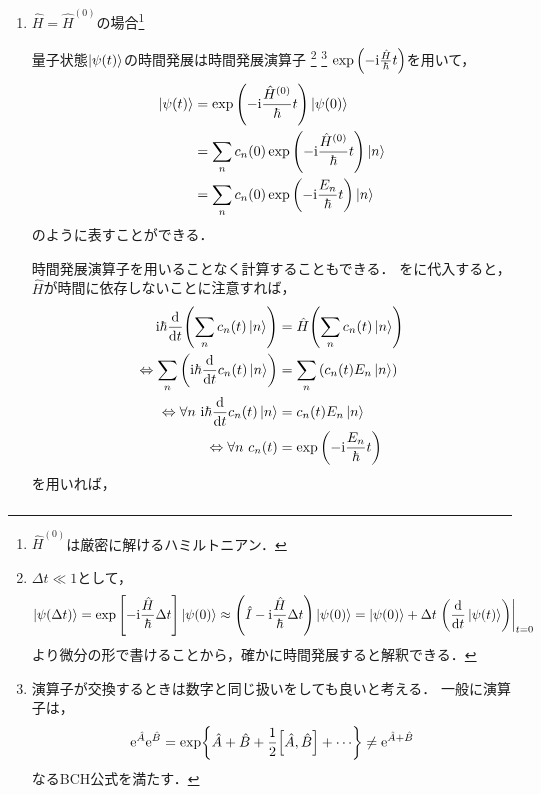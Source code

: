 \documentclass{report}
\begin{document}
  \begin{enumerate}
    \item $\hat{H} = \hat{H}^{(0)}$の場合\footnote{$\hat{H}^{(0)}$は厳密に解けるハミルトニアン．}\par
      量子状態$\ket{\psi(t)}$の時間発展は時間発展演算子
      \footnote{
        $\Delta t \ll 1$として，
        \begin{align*}
          \ket{\psi(\Delta t)} = \exp\qty[-\mathrm{i}\frac{\hat{H}}{\hbar}\Delta t]\ket{\psi(0)} \approx\qty(\hat{I} - \mathrm{i}\frac{\hat{H}}{\hbar}\Delta t)\ket{\psi(0)}
          = \ket{\psi(0)} + \Delta t \left.\qty(\dv{t}\ket{\psi(t)})\right|_{t = 0}
        \end{align*}
        より微分の形で書けることから，確かに時間発展すると解釈できる．}
      \footnote{
        演算子が交換するときは数字と同じ扱いをしても良いと考える．
        一般に演算子は，
        \begin{align*}
          \mathrm{e}^{\hat{A}}\mathrm{e}^{\hat{B}} = \exp{\hat{A} + \hat{B} + \frac{1}{2}\qty[\hat{A},\hat{B}] + \cdots}\neq\mathrm{e}^{\hat{A} + \hat{B}}
        \end{align*}
        なるBCH公式を満たす．
      }
      $\exp\qty(-\mathrm{i}\frac{\hat{H}}{\hbar}t)$を用いて，
      \begin{align}
        \ket{\psi(t)} &= \exp\qty(-\mathrm{i}\frac{\hat{H}^{(0)}}{\hbar}t)\ket{\psi(0)} \\
        &= \sum_{n}c_n(0)\exp\qty(-\mathrm{i}\frac{\hat{H}^{(0)}}{\hbar}t)\ket{n} \\
        &= \sum_{n}c_n(0)\exp\qty(-\mathrm{i}\frac{E_n}{\hbar}t)\ket{n}
      \end{align}
      のように表すことができる．
      \par
      時間発展演算子を用いることなく計算することもできる．
      をに代入すると，$\hat{H}$が時間に依存しないことに注意すれば，
      \begin{align}
        \mathrm{i}\hbar\dv{t}\qty(\sum_{n}c_n(t)\ket{n}) &= \hat{H}\qty(\sum_{n}c_n(t)\ket{n}) \label{naive-solution-to-decide-ct}\\ 
        \Leftrightarrow \sum_{n}\qty(\mathrm{i}\hbar\dv{t}c_n(t)\ket{n}) &= \sum_{n}\qty(c_n(t)E_n\ket{n}) \\ 
        \Leftrightarrow \forall n\ \mathrm{i}\hbar\dv{t}c_n(t)\ket{n} &= c_n(t)E_n\ket{n} \\ 
        \Leftrightarrow \forall n\ c_n(t) &= \exp\qty(-\mathrm{i}\frac{E_n}{\hbar}t)
      \end{align}
      を用いれば，
      \begin{align}

\end{align}
\end{enumerate}
\end{document}
